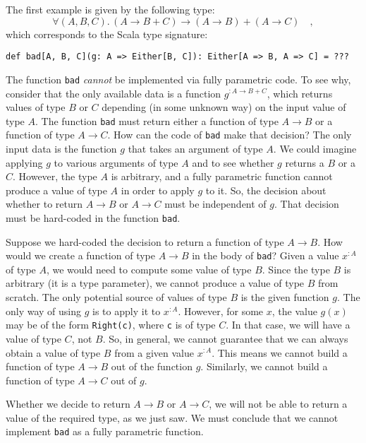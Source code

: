 The first example is given by the following type:
\begin{equation}
\forall(A,B,C).\,\left(A\rightarrow B+C\right)\rightarrow\left(A\rightarrow B\right)+\left(A\rightarrow C\right)\quad,\label{eq:ch-example-boolean-bad-type}
\end{equation}
which corresponds to the Scala type signature:
\begin{lstlisting}
def bad[A, B, C](g: A => Either[B, C]): Either[A => B, A => C] = ???
\end{lstlisting}
The function \lstinline!bad! \emph{cannot} be implemented via fully
parametric code. To see why, consider that the only available data
is a function $g^{:A\rightarrow B+C}$, which returns values of type
$B$ or $C$ depending (in some unknown way) on the input value of
type $A$. The function \lstinline!bad! must return either a function
of type $A\rightarrow B$ or a function of type $A\rightarrow C$.
How can the code of \lstinline!bad! make that decision? The only
input data is the function $g$ that takes an argument of type $A$.
We could imagine applying $g$ to various arguments of type $A$ and
to see whether $g$ returns a $B$ or a $C$. However, the type $A$
is arbitrary, and a fully parametric function cannot produce a value
of type $A$ in order to apply $g$ to it. So, the decision about
whether to return $A\rightarrow B$ or $A\rightarrow C$ must be independent
of $g$. That decision must be hard-coded in the function \lstinline!bad!.

Suppose we hard-coded the decision to return a function of type $A\rightarrow B$.
How would we create a function of type $A\rightarrow B$ in the body
of \lstinline!bad!? Given a value $x^{:A}$ of type $A$, we would
need to compute some value of type $B$. Since the type $B$ is arbitrary
(it is a type parameter), we cannot produce a value of type $B$ from
scratch. The only potential source of values of type $B$ is the given
function $g$. The only way of using $g$ is to apply it to $x^{:A}$.
However, for some $x$, the value $g(x)$ may be of the form \lstinline!Right(c)!,
where \lstinline!c! is of type $C$. In that case, we will have a
value of type $C$, not $B$. So, in general, we cannot guarantee
that we can always obtain a value of type $B$ from a given value
$x^{:A}$. This means we cannot build a function of type $A\rightarrow B$
out of the function $g$. Similarly, we cannot build a function of
type $A\rightarrow C$ out of $g$. 

Whether we decide to return $A\rightarrow B$ or $A\rightarrow C$,
we will not be able to return a value of the required type, as we
just saw. We must conclude that we cannot implement \lstinline!bad!
as a fully parametric function.

